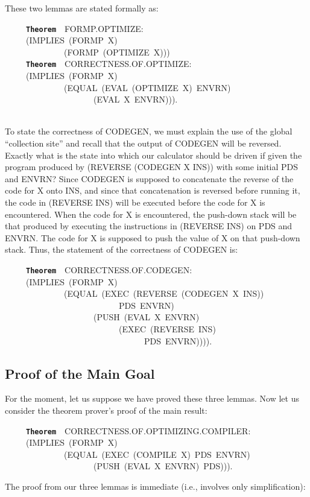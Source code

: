 \documentclass[11pt]{book}
\newenvironment{pubasis}{\begin{flushleft}\ttfamily\small}{\normalsize\rmfamily\end{flushleft}}
\newcommand{\axiomordefinition}[1]{\vspace{6pt}\texttt{\textbf{#1}}}
\newcommand{\pubdefaulttextsize}{\large}
\begin{document}
These two lemmas are stated formally as:
\begin{pubasis}
~~~~~\axiomordefinition{Theorem}~~FORMP.OPTIMIZE:\\
~~~~~(IMPLIES~(FORMP~X)\\
~~~~~~~~~~~~~~(FORMP~(OPTIMIZE~X)))\\

~~~~~\axiomordefinition{Theorem}~~CORRECT\-NESS.OF.OPTIMIZE:\\
~~~~~(IMPLIES~(FORMP~X)\\
~~~~~~~~~~~~~~(EQUAL~(EVAL~(OPTIMIZE~X)~ENVRN)\\
~~~~~~~~~~~~~~~~~~~~~(EVAL~X~ENVRN))).\\
~~~~~~~~~~~~~~~~~~~~~~~~~~~~~~~~~~~~~~~~~~~~~~~~~~~~~~~~\\
\end{pubasis}
To state the correctness of CODEGEN, we must explain the use of the global ``collection site''
and recall that the output of CODEGEN will be reversed.
Exactly what is the state into which our calculator should be driven
if given the program produced by (REVERSE (CODEGEN X INS)) with some initial PDS and
ENVRN?  Since CODEGEN is supposed to concatenate the reverse of the code
for X onto INS, and since that concatenation is reversed before running it,
the code in (REVERSE INS) will be executed before the code
for X is encountered.  When the code for
X is encountered, the push-down stack will be   that produced by executing
the instructions in (REVERSE INS) on PDS and ENVRN.  The code for X is supposed to push the value
of X on that push-down stack.  Thus, the statement of the correctness of
CODEGEN is:
\begin{pubasis}
~~~~~\axiomordefinition{Theorem}~~CORRECT\-NESS.OF.CODEGEN:\\
~~~~~(IMPLIES~(FORMP~X)\\
~~~~~~~~~~~~~~(EQUAL~(EXEC~(REVERSE~(CODEGEN~X~INS))\\
~~~~~~~~~~~~~~~~~~~~~~~~~~~PDS~ENVRN)\\
~~~~~~~~~~~~~~~~~~~~~(PUSH~(EVAL~X~ENVRN)\\
~~~~~~~~~~~~~~~~~~~~~~~~~~~(EXEC~(REVERSE~INS)\\
~~~~~~~~~~~~~~~~~~~~~~~~~~~~~~~~~PDS~ENVRN)))).\\
\end{pubasis}
\subsection{Proof of the Main Goal}
\pubdefaulttextsize
For the moment, let us suppose we have proved these three lemmas.
Now let us consider the theorem prover's proof of the main result:
\begin{pubasis}
~~~~~\axiomordefinition{Theorem}~~CORRECT\-NESS.OF.OPTIMIZING.COMPILER:\\
~~~~~(IMPLIES~(FORMP~X)\\
~~~~~~~~~~~~~~(EQUAL~(EXEC~(COMPILE~X)~PDS~ENVRN)\\
~~~~~~~~~~~~~~~~~~~~~(PUSH~(EVAL~X~ENVRN)~PDS))).\\
\end{pubasis}
The proof from our three lemmas is immediate (i.e., involves only
simplification):
\end{document}
